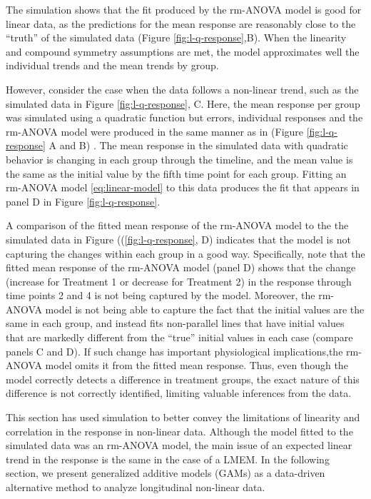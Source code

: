 \documentclass[
]{article}
\begin{document}
The simulation shows that the fit produced by the rm-ANOVA model is good for linear data, as the predictions for the mean response are reasonably close to the ``truth'' of the simulated data (Figure \ref{fig:l-q-response},B). When the linearity and compound symmetry assumptions are met, the model approximates well the individual trends and the mean trends by group.

However, consider the case when the data follows a non-linear trend, such as the simulated data in Figure \ref{fig:l-q-response}, C. Here, the mean response per group was simulated using a quadratic function but errors, individual responses and the rm-ANOVA model were produced in the same manner as in (Figure \ref{fig:l-q-response} A and B) . The mean response in the simulated data with quadratic behavior is changing in each group through the timeline, and the mean value is the same as the initial value by the fifth time point for each group. Fitting an rm-ANOVA model \eqref{eq:linear-model} to this data produces the fit that appears in panel D in Figure \ref{fig:l-q-response}.

A comparison of the fitted mean response of the rm-ANOVA model to the the simulated data in Figure ((\ref{fig:l-q-response}, D) indicates that the model is not capturing the changes within each group in a good way. Specifically, note that the fitted mean response of the rm-ANOVA model (panel D) shows that the change (increase for Treatment 1 or decrease for Treatment 2) in the response through time points 2 and 4 is not being captured by the model. Moreover, the rm-ANOVA model is not being able to capture the fact that the initial values are the same in each group, and instead fits non-parallel lines that have initial values that are markedly different from the ``true'' initial values in each case (compare panels C and D). If such change has important physiological implications,the rm-ANOVA model omits it from the fitted mean response. Thus, even though the model correctly detects a difference in treatment groups, the exact nature of this difference is not correctly identified, limiting valuable inferences from the data.

This section has used simulation to better convey the limitations of linearity and correlation in the response in non-linear data. Although the model fitted to the simulated data was an rm-ANOVA model, the main issue of an expected linear trend in the response is the same in the case of a LMEM. In the following section, we present generalized additive models (GAMs) as a data-driven alternative method to analyze longitudinal non-linear data.
\end{document}
